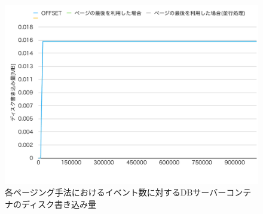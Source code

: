 \documentclass[../../../../../main]{subfiles}
\begin{document}
    \begin{figure}[H]
        \centering
        \includegraphics[width=12cm]{graph}
        \caption{各ページング手法におけるイベント数に対するDBサーバーコンテナのディスク書き込み量}
        \label{fig:each-paging-db-disk-in-app_1_1024-db_1_1024}
    \end{figure}
\end{document}
